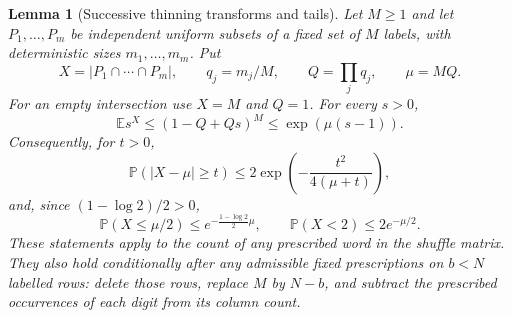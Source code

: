 \documentclass[11pt]{article}
\numberwithin{equation}{section}
\newtheorem{lemma}[theorem]{Lemma}
\theoremstyle{definition}
\theoremstyle{remark}
\newcommand{\E}{\mathbb E}
\newcommand{\Pp}{\mathbb P}
\newcommand{\1}{\mathbf 1}
\begin{document}
\begin{lemma}[Successive thinning transforms and tails]
\label{lem:successive-thinning-tail}
Let \(M\ge1\) and let \(P_1,\ldots,P_m\) be independent uniform
subsets of a fixed set of \(M\) labels, with deterministic sizes
\(m_1,\ldots,m_m\). Put
\[
 X=|P_1\cap\cdots\cap P_m|,\qquad
 q_j=m_j/M,\qquad Q=\prod_jq_j,\qquad \mu=MQ.
\]
For an empty intersection use \(X=M\) and \(Q=1\). For every \(s>0\),
\begin{equation}
\label{eq:thinning-transform}
 \E s^X\le(1-Q+Qs)^M\le \exp(\mu(s-1)).
\end{equation}
Consequently, for \(t>0\),
\begin{equation}
\label{eq:thinning-bernstein}
 \Pp(|X-\mu|\ge t)\le
 2\exp\left(-\frac{t^2}{4(\mu+t)}\right),
\end{equation}
and, since $(1-\log2)/2>0$,
\begin{equation}
\label{eq:thinning-lower-tail}
 \Pp(X\le\mu/2)\le e^{-\frac{1-\log2}{2}\mu},
 \qquad \Pp(X<2)\le2e^{-\mu/2}.
\end{equation}
These statements apply to the count of any prescribed word in the shuffle
matrix. They also hold conditionally after any admissible fixed prescriptions
on \(b<N\) labelled rows: delete those rows, replace \(M\) by \(N-b\),
and subtract the prescribed occurrences of each digit from its column count.
\end{lemma}
\end{document}
